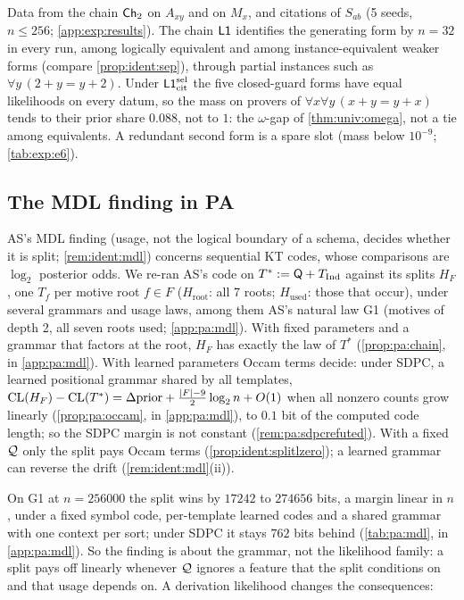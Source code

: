 \begin{remark}[E6: commutativity]\pabrk{}\label{rem:pa:e6}
Data from the chain $\mathsf{Ch}_{2}$ on $A_{xy}$ and on $M_x$, and \Lzero{} citations of $S_{ab}$ (5 seeds, $n\le256$; \cref{app:exp:results}). The chain $\mathord{\mathsf{L1}}$ identifies the generating form by $n=32$ in every run, among logically equivalent and among instance-equivalent weaker forms (compare \cref{prop:ident:sep}), through partial instances such as $\forall y\,(2+y=y+2)$. Under $\mathord{\mathsf{L1}}^{\mathrm{sel}}_{\mathrm{cit}}$ the five closed-guard forms have equal likelihoods on every datum, so the mass on provers of $\forall x\forall y\,(x+y=y+x)$ tends to their prior share $0.088$, not to $1$: the $\omega$-gap of \cref{thm:univ:omega}, not a tie among equivalents. A redundant second form is a spare slot (mass below $10^{-9}$; \cref{tab:exp:e6}).
\end{remark}

\subsection{The MDL finding in PA}\label{sec:pa:mdl}

AS's MDL finding (usage, not the logical boundary of a schema, decides whether it is split; \cref{rem:ident:mdl}) concerns sequential KT codes, whose comparisons are $\log_2$ posterior odds. We re-ran AS's code on $T^*:=\mathsf{Q}+T_{\mathrm{Ind}}$ against its splits $H_F$, one $T_f$ per motive root $f\in F$ ($H_{\mathrm{root}}$: all 7 roots; $H_{\mathrm{used}}$: those that occur), under several grammars and usage laws, among them AS's natural law G1 (motives of depth 2, all seven roots used; \cref{app:pa:mdl}). With fixed parameters and a grammar that factors at the root, $H_F$ has exactly the law of $T^*$ (\cref{prop:pa:chain}, in \cref{app:pa:mdl}). With learned parameters Occam terms decide: under SDPC, a learned positional grammar shared by all templates, $\mathrm{CL}(H_F)-\mathrm{CL}(T^*)=\Delta\mathrm{prior}+\frac{|F|-9}2\log_2n+O(1)$ when all nonzero counts grow linearly (\cref{prop:pa:occam}, in \cref{app:pa:mdl}), to $0.1$ bit of the computed code length; so the SDPC margin is not constant (\cref{rem:pa:sdpcrefuted}). With a fixed $\mathcal{Q}$ only the split pays Occam terms (\cref{prop:ident:splitlzero}); a learned grammar can reverse the drift (\cref{rem:ident:mdl}(ii)).

On G1 at $n=256000$ the split wins by $17242$ to $274656$ bits, a margin linear in $n$, under a fixed symbol code, per-template learned codes and a shared grammar with one context per sort; under SDPC it stays $762$ bits behind (\cref{tab:pa:mdl}, in \cref{app:pa:mdl}). So the finding is about the grammar, not the likelihood family: a split pays off linearly whenever $\mathcal{Q}$ ignores a feature that the split conditions on and that usage depends on. A derivation likelihood changes the consequences:

